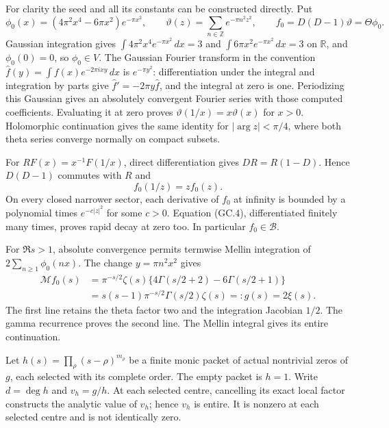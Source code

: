 \documentclass[11pt]{article}
\begin{document}
For clarity the seed and all its constants can be constructed directly.
Put
\[
 \phi_0(x)=(4\pi^2x^4-6\pi x^2)e^{-\pi x^2},\qquad
 \vartheta(z)=\sum_{n\in\mathbb Z}e^{-\pi n^2z^2},\qquad
 f_0=D(D-1)\vartheta=\Theta\phi_0.                              \tag{GC.3}
\]
Gaussian integration gives $\int4\pi^2x^4e^{-\pi x^2}\,dx=3$ and
$\int6\pi x^2e^{-\pi x^2}\,dx=3$ on $\mathbb R$, and
$\phi_0(0)=0$, so $\phi_0\in V$. The Gaussian Fourier transform
in the convention $\widehat f(y)=\int f(x)e^{-2\pi ixy}\,dx$ is
$e^{-\pi y^2}$: differentiation under the integral and integration by
parts give $\widehat f'=-2\pi y\widehat f$, and the integral at zero
is one. Periodizing this Gaussian gives an absolutely convergent
Fourier series with those computed coefficients. Evaluating it at zero
proves $\vartheta(1/x)=x\vartheta(x)$ for $x>0$. Holomorphic
continuation gives the same identity for $|\arg z|<\pi/4$, where
both theta series converge normally on compact subsets.

For $RF(x)=x^{-1}F(1/x)$, direct differentiation gives
$DR=R(1-D)$. Hence $D(D-1)$ commutes with $R$ and
\[
 f_0(1/z)=z f_0(z).                                             \tag{GC.4}
\]
On every closed narrower sector, each derivative of $f_0$ at infinity
is bounded by a polynomial times $e^{-c|z|^2}$ for some $c>0$.
Equation (GC.4), differentiated finitely many times, proves rapid
decay at zero too. In particular $f_0\in\mathscr B$.

For $\Re s>1$, absolute convergence permits termwise Mellin integration
of $2\sum_{n\ge1}\phi_0(nx)$. The change $y=\pi n^2x^2$ gives
\[
 \begin{split}
 \mathcal Mf_0(s)
 &=\pi^{-s/2}\zeta(s)
       \{4\Gamma(s/2+2)-6\Gamma(s/2+1)\}\\
 &=s(s-1)\pi^{-s/2}\Gamma(s/2)\zeta(s)=:g(s)=2\xi(s).
 \end{split}                                                   \tag{GC.5}
\]
The first line retains the theta factor two and the integration
Jacobian $1/2$. The gamma recurrence proves the second line. The
Mellin integral gives its entire continuation.

Let $h(s)=\prod_\rho(s-\rho)^{m_\rho}$ be a finite monic packet of
actual nontrivial zeros of $g$, each selected with its complete order.
The empty packet is $h=1$. Write $d=\deg h$ and $v_h=g/h$.
At each selected centre, cancelling its exact local factor constructs
the analytic value of $v_h$; hence $v_h$ is entire. It is nonzero at
each selected centre and is not identically zero.
\end{document}
